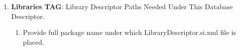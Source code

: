 \begin{enumerate}
\begin{enumerate}
\begin{center}
{{\begin{enumerate}
						\end{enumerate}

					\vspace*{0.0cm} %
				}
			}

			\end{center}
		\end{enumerate}

	\item \small \textbf{Libraries TAG}: Library Descriptor Paths Needed Under This Database Descriptor.

		\begin{enumerate}

			\item \small Provide full package name under which LibraryDescriptor.si.xml file is placed.

		\end{enumerate}


\end{enumerate}

